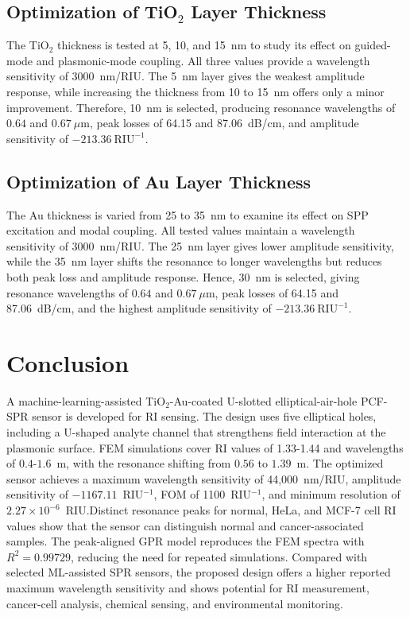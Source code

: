 \documentclass[ACS,STIX2COL]{WileyNJD-v2}
\begin{document}
\subsection{Optimization of TiO$_2$ Layer Thickness}

The TiO$_2$ thickness is tested at 5, 10, and 15~nm to study its effect on guided-mode and plasmonic-mode coupling. All three values provide a wavelength sensitivity of 3000~nm/RIU. The 5~nm layer gives the weakest amplitude response, while increasing the thickness from 10 to 15~nm offers only a minor improvement. Therefore, 10~nm is selected, producing resonance wavelengths of $0.64$ and $0.67~\mu\mathrm{m}$, peak losses of 64.15 and 87.06~dB/cm, and amplitude sensitivity of $-213.36~\mathrm{RIU}^{-1}$.

\subsection{Optimization of Au Layer Thickness}

The Au thickness is varied from 25 to 35~nm to examine its effect on SPP excitation and modal coupling. All tested values maintain a wavelength sensitivity of 3000~nm/RIU. The 25~nm layer gives lower amplitude sensitivity, while the 35~nm layer shifts the resonance to longer wavelengths but reduces both peak loss and amplitude response. Hence, 30~nm is selected, giving resonance wavelengths of $0.64$ and $0.67~\mu\mathrm{m}$, peak losses of 64.15 and 87.06~dB/cm, and the highest amplitude sensitivity of $-213.36~\mathrm{RIU}^{-1}$.




\section{Conclusion}

A machine-learning-assisted TiO$_2$-Au-coated U-slotted elliptical-air-hole PCF-SPR sensor is developed for RI sensing. The design uses five elliptical holes, including a U-shaped analyte channel that strengthens field interaction at the plasmonic surface. FEM simulations cover RI values of 1.33-1.44 and wavelengths of $0.4$-$1.6$~\textmu m, with the resonance shifting from $0.56$ to $1.39$~\textmu m. The optimized sensor achieves a maximum wavelength sensitivity of 44,000~nm/RIU, amplitude sensitivity of $-1167.11$~RIU$^{-1}$, FOM of 1100~RIU$^{-1}$, and minimum resolution of $2.27\times10^{-6}$~RIU.Distinct resonance peaks for normal, HeLa, and MCF-7 cell RI values show that the sensor can distinguish normal and cancer-associated samples. The peak-aligned GPR model reproduces the FEM spectra with $R^2=0.99729$, reducing the need for repeated simulations. Compared with selected ML-assisted SPR sensors, the proposed design offers a higher reported maximum wavelength sensitivity and shows potential for RI measurement, cancer-cell analysis, chemical sensing, and environmental monitoring.


\end{document}
